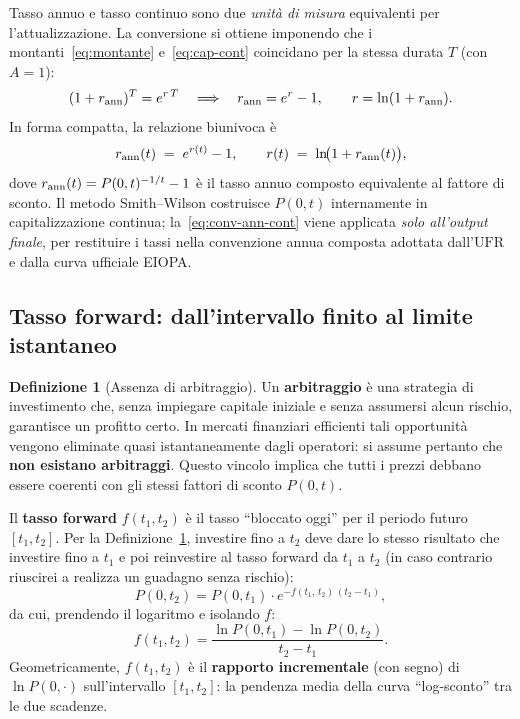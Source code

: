\documentclass[11pt,a4paper]{article}
\theoremstyle{plain}
\theoremstyle{definition}
\newtheorem{definizione}[teorema]{Definizione}
\theoremstyle{remark}
\newcommand{\UFR}{\ensuremath{\mathrm{UFR}}}
\begin{document}
Tasso annuo e tasso continuo sono due \emph{unit\`a di misura} equivalenti per
l'attualizzazione. La conversione si ottiene imponendo che i montanti~\eqref{eq:montante}
e~\eqref{eq:cap-cont} coincidano per la stessa durata $T$ (con $A=1$):
\[
  (1+r_{\rm ann})^T = e^{r\,T}
  \quad\Longrightarrow\quad
  r_{\rm ann} = e^{r} - 1,\qquad r = \ln(1+r_{\rm ann}).
\]
In forma compatta, la relazione biunivoca \`e
\begin{equation}
  r_{\rm ann}(t) \;=\; e^{r(t)} - 1,
  \qquad
  r(t) \;=\; \ln\!\bigl(1 + r_{\rm ann}(t)\bigr),
  \label{eq:conv-ann-cont}
\end{equation}
dove $r_{\rm ann}(t) = P(0,t)^{-1/t}-1$ \`e il tasso annuo composto equivalente al fattore
di sconto. Il metodo Smith--Wilson costruisce $P(0,t)$ internamente in capitalizzazione
continua; la~\eqref{eq:conv-ann-cont} viene applicata \emph{solo all'output finale}, per
restituire i tassi nella convenzione annua composta adottata dall'$\UFR$ e dalla curva
ufficiale EIOPA.

\subsection{Tasso forward: dall'intervallo finito al limite istantaneo}


\begin{definizione}[Assenza di arbitraggio]
\label{def:noarb}
Un \textbf{arbitraggio} \`e una strategia di investimento che, senza impiegare capitale
iniziale e senza assumersi alcun rischio, garantisce un profitto certo. In mercati
finanziari efficienti tali opportunit\`a vengono eliminate quasi istantaneamente dagli
operatori: si assume pertanto che \textbf{non esistano arbitraggi}. Questo vincolo implica
che tutti i prezzi debbano essere coerenti con gli stessi fattori di sconto $P(0,t)$.
\end{definizione}

Il \textbf{tasso forward} $f(t_1, t_2)$ \`e il tasso ``bloccato oggi'' per il periodo
futuro $[t_1, t_2]$. Per la Definizione~\ref{def:noarb}, investire fino a $t_2$ deve dare lo stesso
risultato che investire fino a $t_1$ e poi reinvestire al tasso forward da $t_1$ a $t_2$ (in caso contrario riuscirei a realizza un guadagno senza rischio):
\[
  P(0, t_2) = P(0, t_1) \cdot e^{-f(t_1,\,t_2)\,(t_2-t_1)},
\]
da cui, prendendo il logaritmo e isolando $f$:
\begin{equation}
  f(t_1, t_2) = \frac{\ln P(0,t_1) - \ln P(0,t_2)}{t_2 - t_1}.
  \label{eq:fwd-finito}
\end{equation}
Geometricamente, $f(t_1,t_2)$ \`e il \textbf{rapporto incrementale} (con segno) di
$\ln P(0,\cdot)$ sull'intervallo $[t_1,t_2]$: la pendenza media della curva
``log-sconto'' tra le due scadenze.
\end{document}
